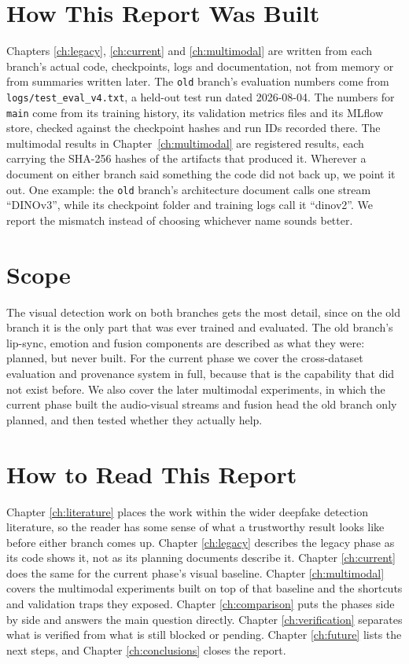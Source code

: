 \section{How This Report Was Built}

Chapters \ref{ch:legacy}, \ref{ch:current} and \ref{ch:multimodal} are written
from each branch's actual code, checkpoints, logs and documentation, not from
memory or from summaries written later. The \texttt{old} branch's evaluation
numbers come from \texttt{logs/test\_eval\_v4.txt}, a held-out test run dated
2026-08-04. The numbers for \texttt{main} come from its training history, its
validation metrics files and its MLflow store, checked against the checkpoint
hashes and run IDs recorded there. The multimodal results in
Chapter~\ref{ch:multimodal} are registered results, each carrying the SHA-256
hashes of the artifacts that produced it. Wherever a document on either branch
said something the code did not back up, we point it out. One example: the
\texttt{old} branch's architecture document calls one stream ``DINOv3'', while
its checkpoint folder and training logs call it ``dinov2''. We report the
mismatch instead of choosing whichever name sounds better.

\section{Scope}

The visual detection work on both branches gets the most detail, since on the
old branch it is the only part that was ever trained and evaluated. The old
branch's lip-sync, emotion and fusion components are described as what they
were: planned, but never built. For the current phase we cover the
cross-dataset evaluation and provenance system in full, because that is the
capability that did not exist before. We also cover the later multimodal
experiments, in which the current phase built the audio-visual streams and
fusion head the old branch only planned, and then tested whether they actually
help.

\section{How to Read This Report}

Chapter \ref{ch:literature} places the work within the wider deepfake
detection literature, so the reader has some sense of what a trustworthy
result looks like before either branch comes up. Chapter \ref{ch:legacy}
describes the legacy phase as its code shows it, not as its planning documents
describe it. Chapter \ref{ch:current} does the same for the current phase's
visual baseline. Chapter \ref{ch:multimodal} covers the multimodal experiments
built on top of that baseline and the shortcuts and validation traps they
exposed. Chapter \ref{ch:comparison} puts the phases side by side and answers
the main question directly. Chapter \ref{ch:verification} separates what is
verified from what is still blocked or pending. Chapter \ref{ch:future} lists
the next steps, and Chapter \ref{ch:conclusions} closes the report.

